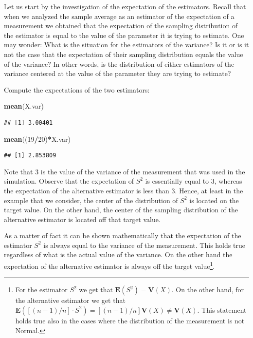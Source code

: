 \documentclass[
]{krantz}
\makeatletter
\newenvironment{Shaded}{\begin{snugshade}}{\end{snugshade}}
\newcommand{\DecValTok}[1]{\textcolor[rgb]{0.00,0.00,0.81}{#1}}
\newcommand{\KeywordTok}[1]{\textcolor[rgb]{0.13,0.29,0.53}{\textbf{#1}}}
\newcommand{\NormalTok}[1]{#1}
\newcommand{\OperatorTok}[1]{\textcolor[rgb]{0.81,0.36,0.00}{\textbf{#1}}}
\newcommand{\Expec}{\mathbf{E}}
\newcommand{\Var}{\mathbf{V}}
\newenvironment{kframe}{%
\medskip{}
\setlength{\fboxsep}{.8em}
 \def\at@end@of@kframe{}%
 \ifinner\ifhmode%
  \def\at@end@of@kframe{\end{minipage}}%
  \begin{minipage}{\columnwidth}%
 \fi\fi%
 \def\FrameCommand##1{\hskip\@totalleftmargin \hskip-\fboxsep
 \colorbox{shadecolor}{##1}\hskip-\fboxsep
     \hskip-\linewidth \hskip-\@totalleftmargin \hskip\columnwidth}%
 \MakeFramed {\advance\hsize-\width
   \@totalleftmargin\z@ \linewidth\hsize
   \@setminipage}}%
 {\par\unskip\endMakeFramed%
 \at@end@of@kframe}
\renewenvironment{Shaded}{\begin{kframe}}{\end{kframe}}
\theoremstyle{definition}
\theoremstyle{definition}
\theoremstyle{definition}
\theoremstyle{remark}
\makeatother
\begin{document}
Let us start by the investigation of the expectation of the estimators.
Recall that when we analyzed the sample average as an estimator of the
expectation of a measurement we obtained that the expectation of the
sampling distribution of the estimator is equal to the value of the
parameter it is trying to estimate. One may wonder: What is the
situation for the estimators of the variance? Is it or is it not the
case that the expectation of their sampling distribution equals the
value of the variance? In other words, is the distribution of either
estimators of the variance centered at the value of the parameter they
are trying to estimate?

Compute the expectations of the two estimators:

\begin{Shaded}
\begin{Highlighting}[]
\KeywordTok{mean}\NormalTok{(X.var)}
\end{Highlighting}
\end{Shaded}

\begin{verbatim}
## [1] 3.00401
\end{verbatim}

\begin{Shaded}
\begin{Highlighting}[]
\KeywordTok{mean}\NormalTok{((}\DecValTok{19}\OperatorTok{/}\DecValTok{20}\NormalTok{)}\OperatorTok{*}\NormalTok{X.var)}
\end{Highlighting}
\end{Shaded}

\begin{verbatim}
## [1] 2.853809
\end{verbatim}

Note that 3 is the value of the variance of the measurement that was
used in the simulation. Observe that the expectation of \(S^2\) is
essentially equal to 3, whereas the expectation of the alternative
estimator is less than 3. Hence, at least in the example that we
consider, the center of the distribution of \(S^2\) is located on the
target value. On the other hand, the center of the sampling distribution
of the alternative estimator is located off that target value.

As a matter of fact it can be shown mathematically that the expectation
of the estimator \(S^2\) is always equal to the variance of the
measurement. This holds true regardless of what is the actual value of
the variance. On the other hand the expectation of the alternative
estimator is always off the target value\footnote{For the estimator \(S^2\) we get that \(\Expec(S^2) = \Var(X)\). On
  the other hand, for the alternative estimator we get that
  \(\Expec([(n-1)/n]\cdot S^2) = [(n-1)/n]\Var(X) \not = \Var(X)\). This
  statement holds true also in the cases where the distribution of the
  measurement is not Normal.}.
\end{document}
